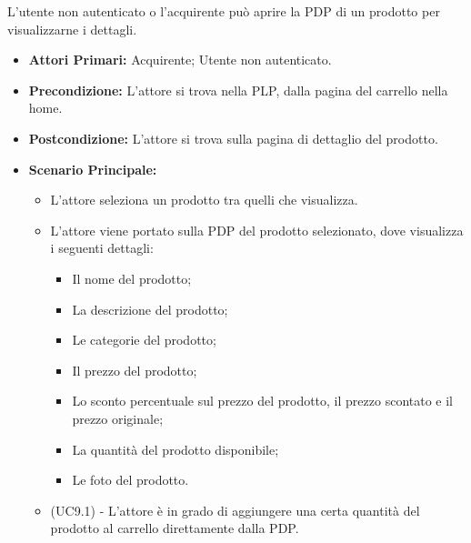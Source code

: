 
L'utente non autenticato o l'acquirente può aprire la PDP di un prodotto per visualizzarne i dettagli. 
\begin{itemize}
    \item \textbf{Attori Primari:} Acquirente; Utente non autenticato.
    \item \textbf{Precondizione:} L'attore si trova nella PLP, dalla pagina del carrello nella home.
    \item \textbf{Postcondizione:} L'attore si trova sulla pagina di dettaglio del prodotto.
    \item \textbf{Scenario Principale:}
        \begin{itemize}
            \item L'attore seleziona un prodotto tra quelli che visualizza.
            \item L'attore viene portato sulla PDP del prodotto selezionato, dove visualizza i seguenti dettagli:
            \begin{itemize}
                \item Il nome del prodotto;
                \item La descrizione del prodotto;
                \item Le categorie del prodotto;
                \item Il prezzo del prodotto;
                \item Lo sconto percentuale sul prezzo del prodotto, il prezzo scontato e il prezzo originale;
                \item La quantità del prodotto disponibile;
                \item Le foto del prodotto.
            \end{itemize}
            \item (UC9.1) - L'attore è in grado di aggiungere una certa quantità del prodotto al carrello direttamente dalla PDP. 
        \end{itemize}
\end{itemize}

